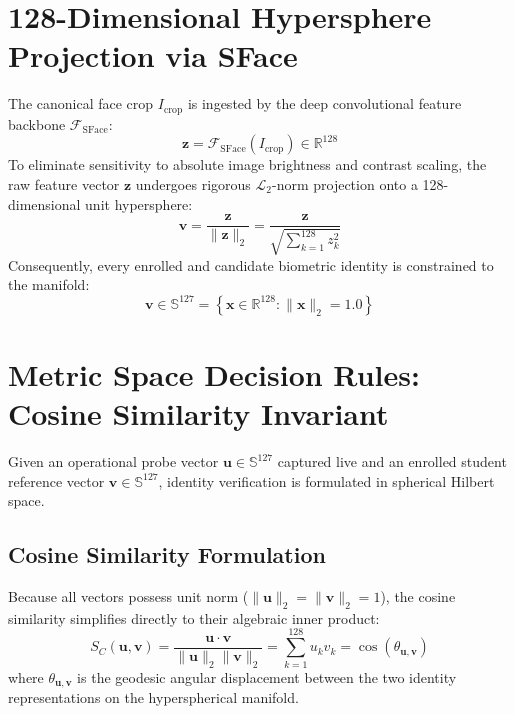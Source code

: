 \documentclass[12pt,a4paper,oneside]{report}
\begin{document}
\section{128-Dimensional Hypersphere Projection via SFace}
The canonical face crop $I_{\text{crop}}$ is ingested by the deep convolutional feature backbone $\mathcal{F}_{\text{SFace}}$:
\begin{equation}
\mathbf{z} = \mathcal{F}_{\text{SFace}}(I_{\text{crop}}) \in \mathbb{R}^{128}
\end{equation}
To eliminate sensitivity to absolute image brightness and contrast scaling, the raw feature vector $\mathbf{z}$ undergoes rigorous $\mathcal{L}_2$-norm projection onto a 128-dimensional unit hypersphere:
\begin{equation}
\mathbf{v} = \frac{\mathbf{z}}{\|\mathbf{z}\|_2} = \frac{\mathbf{z}}{\sqrt{\sum_{k=1}^{128} z_k^2}}
\end{equation}
Consequently, every enrolled and candidate biometric identity is constrained to the manifold:
\begin{equation}
\mathbf{v} \in \mathbb{S}^{127} = \left\{ \mathbf{x} \in \mathbb{R}^{128} : \|\mathbf{x}\|_2 = 1.0 \right\}
\end{equation}

\section{Metric Space Decision Rules: Cosine Similarity Invariant}
Given an operational probe vector $\mathbf{u} \in \mathbb{S}^{127}$ captured live and an enrolled student reference vector $\mathbf{v} \in \mathbb{S}^{127}$, identity verification is formulated in spherical Hilbert space. 

\subsection{Cosine Similarity Formulation}
Because all vectors possess unit norm ($\|\mathbf{u}\|_2 = \|\mathbf{v}\|_2 = 1$), the cosine similarity simplifies directly to their algebraic inner product:
\begin{equation}
S_C(\mathbf{u}, \mathbf{v}) = \frac{\mathbf{u} \cdot \mathbf{v}}{\|\mathbf{u}\|_2 \|\mathbf{v}\|_2} = \sum_{k=1}^{128} u_k v_k = \cos(\theta_{\mathbf{u}, \mathbf{v}})
\end{equation}
where $\theta_{\mathbf{u}, \mathbf{v}}$ is the geodesic angular displacement between the two identity representations on the hyperspherical manifold.
\end{document}
